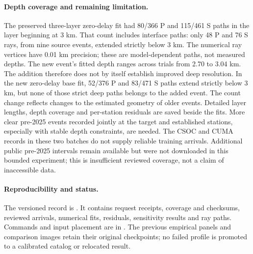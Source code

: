 \paragraph{Depth coverage and remaining limitation.}
The preserved three-layer zero-delay fit had 80/366 P and 115/461 S paths
in the layer beginning at 3 km. That count includes interface paths: only
48 P and 76 S rays, from nine source events, extended strictly below 3 km.
The numerical ray vertices have 0.01 km precision; these are model-dependent
paths, not measured depths. The new event's fitted depth ranges across trials from
2.70 to 3.04 km.
The addition therefore does not by itself establish improved deep resolution.
In the new zero-delay base fit, 52/376 P and 83/471 S paths extend strictly
below 3 km, but none of those strict deep paths belongs to the added event.
The count change reflects changes to the estimated geometry of older events.
Detailed layer lengths, depth coverage and per-station residuals are saved beside
the fits. More clear pre-2025 events recorded jointly at the target and established
stations, especially with stable depth constraints, are needed. The CSOC and CUMA
records in these two batches do not supply reliable training arrivals. Additional
public pre-2025 intervals remain available but were not downloaded in this bounded
experiment; this is insufficient reviewed coverage, not a claim of inaccessible data.

\paragraph{Reproducibility and status.}
The versioned record is .
It contains request receipts, coverage and checksums, reviewed arrivals, numerical
fits, residuals, sensitivity results and ray paths. Commands and input placement are
in . The previous empirical panels and
comparison images retain their original checkpoints; no failed profile is promoted
to a calibrated catalog or relocated result.
